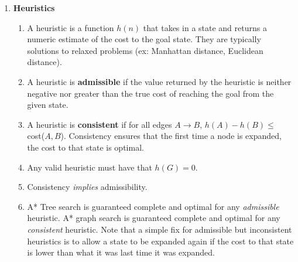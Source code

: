 \documentclass[10pt]{article}
\begin{document}
\begin{multicols}{2}
\begin{addmargin}[0.8em]{0.5em}
\begin{enumerate}[label=(\alph*)]
         \item \textbf{Heuristics}
         \begin{enumerate}[label=\roman*.]
             \item A heuristic is a function $h(n)$ that takes in a state and returns a numeric estimate of the cost to the goal state. They are typically solutions to relaxed problems (ex: Manhattan distance, Euclidean distance).
             \item A heuristic is \textbf{admissible} if the value returned by the heuristic is neither negative nor greater than the true cost of reaching the goal from the given state.
             \item A heuristic is \textbf{consistent} if for all edges $A \rightarrow B$, $h(A) - h(B) \leq$ cost($A,B$). Consistency ensures that the first time a node is expanded, the cost to that state is optimal. 
             \item Any valid heuristic must have that $h(G)=0$.
             \item Consistency \textit{implies} admissibility.
             \item A* Tree search is guaranteed complete and optimal for any \textit{admissible} heuristic. A* graph search is guaranteed complete and optimal for any \textit{consistent} heuristic. Note that a simple fix for admissible but inconsistent heuristics is to allow a state to be expanded again if the cost to that state is lower than what it was last time it was expanded.
        \end{enumerate}
    \end{enumerate}
    

\end{addmargin}
\end{multicols}
\end{document}

